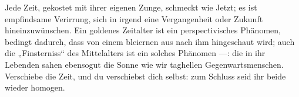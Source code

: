 Jede Zeit, gekostet mit ihrer eigenen Zunge, schmeckt wie Jetzt; es ist empfindsame Verirrung, sich in irgend eine Vergangenheit oder Zukunft hineinzuwünschen. Ein goldenes Zeitalter ist ein perspectivisches Phänomen, bedingt dadurch, dass von einem bleiernen aus nach ihm hingeschaut wird; auch die „Finsterniss“ des Mittelalters ist ein solches Phänomen —: die in ihr Lebenden sahen ebensogut die Sonne wie wir taghellen Gegenwartsmenschen. Verschiebe die Zeit, und du verschiebst dich selbst: zum Schluss seid ihr beide wieder homogen.
\par

